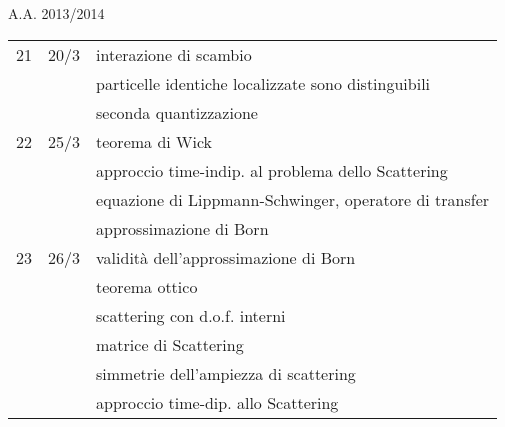 \documentclass[a4paper, 12pt]{article}
\newcommand{\nl}{\\ & & }
\newcommand{\nr}{\\ \midrule}
\begin{document}
\begin{section}{A.A. 2013/2014}
\begin{tabular}{lll}
21 & 20/3 & interazione di scambio \nl particelle identiche localizzate sono distinguibili \nl seconda quantizzazione \nr 

22 & 25/3 & teorema di Wick \nl approccio time-indip. al problema dello Scattering \nl equazione di Lippmann-Schwinger, operatore di transfer \nl approssimazione di Born \nr

23 & 26/3 & validità dell'approssimazione di Born \nl teorema ottico \nl scattering con d.o.f. interni \nl matrice di Scattering \nl simmetrie dell'ampiezza di scattering \nl approccio time-dip. allo Scattering  \nr
\bottomrule
\end{tabular}

\end{section}
\end{document}
